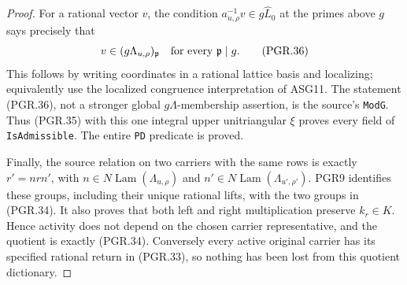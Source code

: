 \documentclass[11pt,a4paper]{article}
\numberwithin{equation}{section}
\theoremstyle{remark}\newtheorem{remark}[theorem]{Remark}
\begin{document}
\begin{proof}
For a rational vector \(v\), the condition
\(a_{u,\rho}^{-1}v\in g\widehat L_0\) at the primes
above \(g\) says precisely that
\[
 v\in(g\Lambda_{u,\rho})_{\mathfrak p}
                         \quad\hbox{for every }\mathfrak p\mid g.
\tag{PGR.36}
\]
This follows by writing coordinates in a rational lattice basis and
localizing; equivalently use the localized congruence interpretation
of ASG11.  The statement (PGR.36), not a stronger global
\(g\Lambda\)-membership assertion, is the source's
\texttt{Mod\allowbreak G}.  Thus (PGR.35) with this one integral upper
unitriangular \(\xi\) proves every field of
\texttt{Is\allowbreak Admissible}.  The entire \texttt{PD} predicate is proved.

Finally, the source relation on two carriers with the same rows is
exactly \(r' = n r n'\), with
\(n\in N\!\operatorname{Lam}(\Lambda_{u,\rho})\) and
\(n'\in N\!\operatorname{Lam}(\Lambda_{u',\rho'})\).
PGR9 identifies these groups, including their unique rational lifts,
with the two groups in (PGR.34).  It also proves that both left and
right multiplication preserve \(k_r\in K\).  Hence activity
does not depend on the chosen carrier representative, and the
quotient is exactly (PGR.34).  Conversely every active original
carrier has its specified rational return in (PGR.33), so nothing
has been lost from this quotient dictionary.
\end{proof}

\end{document}
